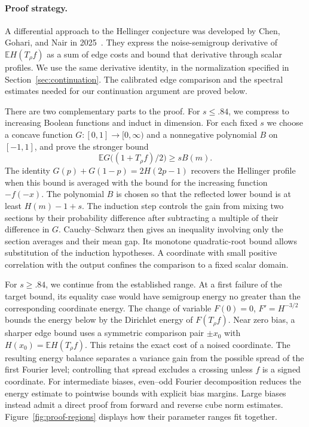 \documentclass[11pt]{article}
\numberwithin{equation}{section}
\theoremstyle{definition}
\theoremstyle{remark}
\newcommand{\E}{\mathbb E}
\begin{document}
\paragraph{Proof strategy.}
A differential approach to the Hellinger conjecture was developed by
Chen, Gohari, and Nair in 2025~\cite[Section~III, Lemma~6 and Theorem~7]{HellingerDifferential}.
They express the noise-semigroup derivative of $\E H(T_\rho f)$ as a
sum of edge costs and bound that derivative through scalar profiles.
We use the same derivative identity, in the normalization specified
in Section~\ref{sec:continuation}. The calibrated edge comparison and
the spectral estimates needed for our continuation argument are
proved below.

There are two complementary parts to the proof. For $s\le .84$,
we compress to increasing Boolean functions and induct in dimension.
For each fixed $s$ we choose a concave function $G:[0,1]\to[0,\infty)$
and a nonnegative polynomial $B$ on $[-1,1]$, and prove the stronger bound
\[
 \E G\bigl((1+T_\rho f)/2\bigr)\ge sB(m).
\]
The identity $G(p)+G(1-p)=2H(2p-1)$ recovers the Hellinger profile
when this bound is averaged with the bound for the increasing function
$-f(-x)$. The polynomial $B$ is chosen so that the reflected lower bound
is at least $H(m)-1+s$.
The induction step controls the gain from mixing two sections by their
probability difference after subtracting a multiple of their difference
in $G$. Cauchy--Schwarz then gives an inequality involving only the
section averages and their mean gap. Its monotone quadratic-root bound
allows substitution of the induction hypotheses. A coordinate with small positive
correlation with the output confines the comparison to a fixed scalar
domain.

For $s\ge .84$, we continue from the established range. At a first
failure of the target bound, its equality case would have semigroup
energy no greater than the corresponding coordinate energy. The change
of variable $F(0)=0$, $F'=H^{-3/2}$ bounds the energy below by the
Dirichlet energy of $F(T_\rho f)$. Near zero bias, a sharper edge bound
uses a symmetric comparison pair $\pm x_0$ with
$H(x_0)=\E H(T_\rho f)$. This retains the exact cost of a noised
coordinate. The resulting energy balance separates a variance gain
from the possible spread of the first Fourier level; controlling that
spread excludes a crossing unless $f$ is a signed coordinate.
For intermediate biases, even--odd Fourier decomposition reduces the
energy estimate to pointwise bounds with explicit bias margins.
Large biases instead admit a direct proof from forward and reverse
cube norm estimates.
Figure~\ref{fig:proof-regions} displays how their parameter ranges fit together.
\end{document}
